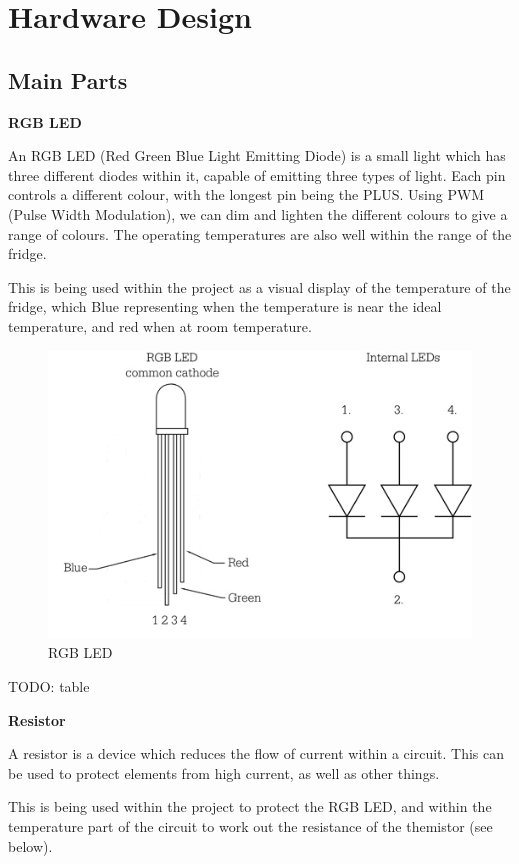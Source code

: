 \documentclass[10pt]{article}
\begin{document}
\newpage
\section{Hardware Design}
\subsection{Main Parts}
\textbf{RGB LED}

An RGB LED (Red Green Blue Light Emitting Diode) is a small light which has three different diodes within it, capable of emitting three types of light. Each pin controls a different colour, with the longest pin being the PLUS. Using PWM (Pulse Width Modulation), we can dim and lighten the different colours to give a range of colours. The operating temperatures are also well within the range of the fridge.

This is being used within the project as a visual display of the temperature of the fridge, which Blue representing when the temperature is near the ideal temperature, and red when at room temperature.

\begin{figure}[h]
\centering
\caption{RGB LED}
\label{RGB LED}
\includegraphics[scale=.5]{images/rgb_led_diagram.jpg}
\end{figure}

TODO: table

\textbf{Resistor}

A resistor is a device which reduces the flow of current within a circuit. This can be used to protect elements from high current, as well as other things.

This is being used within the project to protect the RGB LED, and within the temperature part of the circuit to work out the resistance of the themistor (see below).
\end{document}
